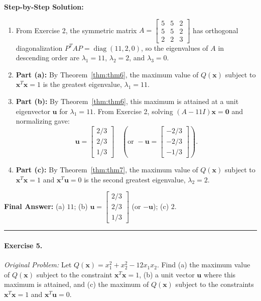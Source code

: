 \documentclass[11pt, letterpaper]{article}
\theoremstyle{definition}
\theoremstyle{remark}
\begin{document}
\textbf{Step-by-Step Solution:}
\begin{enumerate}[leftmargin=2em]
    \item From Exercise 2, the symmetric matrix $A = \begin{bmatrix} 5 & 5 & 2 \\ 5 & 5 & 2 \\ 2 & 2 & 3 \end{bmatrix}$ has orthogonal diagonalization $P^T A P = \operatorname{diag}(11, 2, 0)$, so the eigenvalues of $A$ in descending order are $\lambda_1 = 11$, $\lambda_2 = 2$, and $\lambda_3 = 0$.
    \item \textbf{Part (a):} By Theorem~\ref{thm:thm6}, the maximum value of $Q(\mathbf{x})$ subject to $\mathbf{x}^T \mathbf{x} = 1$ is the greatest eigenvalue, $\lambda_1 = 11$.
    \item \textbf{Part (b):} By Theorem~\ref{thm:thm6}, this maximum is attained at a unit eigenvector $\mathbf{u}$ for $\lambda_1 = 11$. From Exercise 2, solving $(A - 11I)\mathbf{x} = \mathbf{0}$ and normalizing gave:
    \[
    \mathbf{u} = \begin{bmatrix} 2/3 \\ 2/3 \\ 1/3 \end{bmatrix} \quad \left(\text{or } -\mathbf{u} = \begin{bmatrix} -2/3 \\ -2/3 \\ -1/3 \end{bmatrix}\right).
    \]
    \item \textbf{Part (c):} By Theorem~\ref{thm:thm7}, the maximum value of $Q(\mathbf{x})$ subject to $\mathbf{x}^T \mathbf{x} = 1$ and $\mathbf{x}^T \mathbf{u} = 0$ is the second greatest eigenvalue, $\lambda_2 = 2$.
\end{enumerate}
\textbf{Final Answer:} (a) $11$; \quad (b) $\mathbf{u} = \begin{bmatrix} 2/3 \\ 2/3 \\ 1/3 \end{bmatrix}$ (or $-\mathbf{u}$); \quad (c) $2$.

\medskip
\hrule
\medskip

\paragraph{Exercise 5.}
\emph{Original Problem:} Let $Q(\mathbf{x}) = x_1^2 + x_2^2 - 12x_1 x_2$. Find (a) the maximum value of $Q(\mathbf{x})$ subject to the constraint $\mathbf{x}^T \mathbf{x} = 1$, (b) a unit vector $\mathbf{u}$ where this maximum is attained, and (c) the maximum of $Q(\mathbf{x})$ subject to the constraints $\mathbf{x}^T \mathbf{x} = 1$ and $\mathbf{x}^T \mathbf{u} = 0$.
\end{document}
